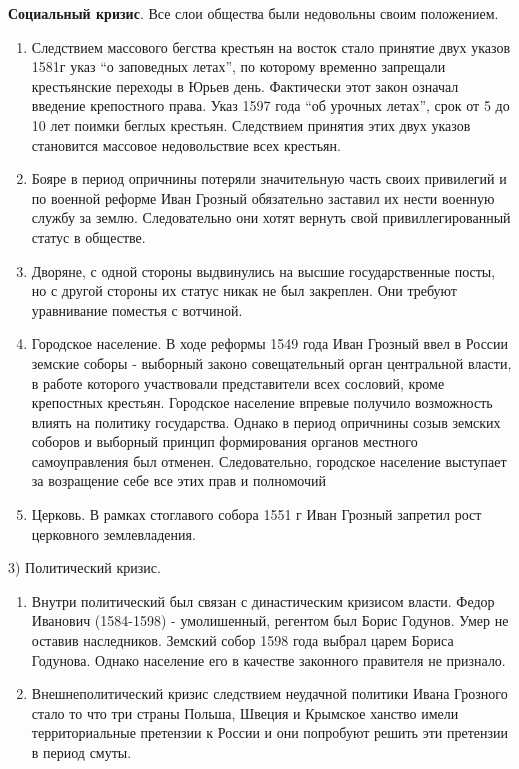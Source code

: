 \documentclass[a4paper]{article}
\begin{document}
    \textbf{Социальный кризис}. Все слои общества были недовольны своим положением.
            \begin{enumerate}
                \item Следствием массового бегства крестьян на восток стало принятие двух указов 1581г указ ``о заповедных летах'', по которому временно запрещали крестьянские переходы в Юрьев день. Фактически этот закон означал введение крепостного права. Указ 1597 года ``об урочных летах'', срок от 5 до 10 лет поимки беглых крестьян. Следствием принятия этих двух указов становится массовое недовольствие всех крестьян. 

                \item Бояре в период опричнины потеряли значительную часть своих привилегий и по военной реформе Иван Грозный обязательно заставил их нести военную службу за землю. Следовательно они хотят вернуть свой привиллегированный статус в обществе.

                \item Дворяне, с одной стороны выдвинулись на высшие государственные посты, но с другой стороны их статус никак не был закреплен. Они требуют уравнивание поместья с вотчиной.

                \item Городское население. В ходе реформы 1549 года Иван Грозный ввел в России земские соборы - выборный законо совещательный орган центральной власти, в работе которого участвовали представители всех сословий, кроме крепостных крестьян. Городское население впревые получило возможность влиять на политику государства. Однако в период опричнины созыв земских соборов и выборный принцип формирования органов местного самоуправления был отменен. Следовательно, городское население выступает за возращение себе все этих прав и полномочий

                \item Церковь. В рамках стоглавого собора 1551 г Иван Грозный запретил рост церковного землевладения.
            \end{enumerate}

        3) Политический кризис. 
            \begin{enumerate}
                \item Внутри политический был связан с династическим кризисом власти. Федор Иванович (1584-1598) - умолишенный, регентом был Борис Годунов. Умер не оставив наследников. Земский собор 1598 года выбрал царем Бориса Годунова. Однако население его в качестве законного правителя не признало.
                \item Внешнеполитический кризис следствием неудачной политики Ивана Грозного стало то что три страны Польша, Швеция и Крымское ханство имели территориальные претензии к России и они попробуют решить эти претензии в период смуты. 
            \end{enumerate}
\end{document}
